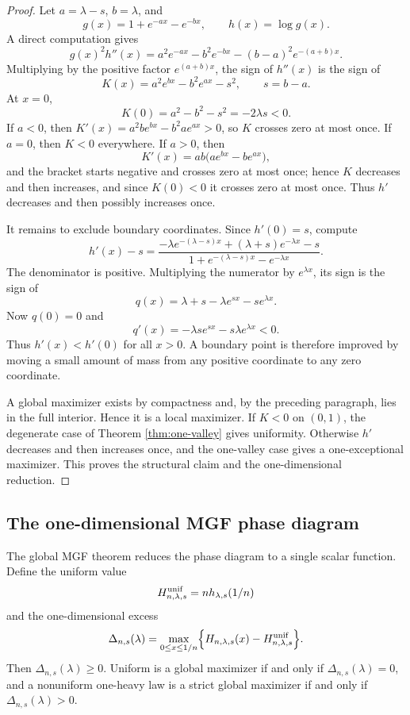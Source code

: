 \documentclass[11pt]{article}
\theoremstyle{definition}
\begin{document}
\begin{proof}
Let $a=\lambda-s$, $b=\lambda$, and
\[
  g(x)=1+e^{-ax}-e^{-bx},
  \qquad h(x)=\log g(x).
\]
A direct computation gives
\[
  g(x)^2h''(x)=a^2e^{-ax}-b^2e^{-bx}-(b-a)^2e^{-(a+b)x}.
\]
Multiplying by the positive factor $e^{(a+b)x}$, the sign of $h''(x)$ is the sign of
\[
  K(x)=a^2e^{bx}-b^2e^{ax}-s^2,
  \qquad s=b-a.
\]
At $x=0$,
\[
  K(0)=a^2-b^2-s^2=-2\lambda s<0.
\]
If $a<0$, then $K'(x)=a^2b e^{bx}-b^2a e^{ax}>0$, so $K$ crosses zero at most once. If $a=0$, then $K<0$ everywhere. If $a>0$, then
\[
  K'(x)=ab\bigl(ae^{bx}-be^{ax}\bigr),
\]
and the bracket starts negative and crosses zero at most once; hence $K$ decreases and then increases, and since $K(0)<0$ it crosses zero at most once. Thus $h'$ decreases and then possibly increases once.

It remains to exclude boundary coordinates. Since $h'(0)=s$, compute
\[
  h'(x)-s
  =\frac{-\lambda e^{-(\lambda-s)x}+(\lambda+s)e^{-\lambda x}-s}
  {1+e^{-(\lambda-s)x}-e^{-\lambda x}}.
\]
The denominator is positive. Multiplying the numerator by $e^{\lambda x}$, its sign is the sign of
\[
  q(x)=\lambda+s-\lambda e^{sx}-s e^{\lambda x}.
\]
Now $q(0)=0$ and
\[
  q'(x)=-\lambda s e^{sx}-s\lambda e^{\lambda x}<0.
\]
Thus $h'(x)<h'(0)$ for all $x>0$.  A boundary point is therefore improved by moving a small amount of mass from any positive coordinate to any zero coordinate.

A global maximizer exists by compactness and, by the preceding paragraph, lies in the full interior.  Hence it is a local maximizer.  If $K<0$ on $(0,1)$, the degenerate case of Theorem \ref{thm:one-valley} gives uniformity.  Otherwise $h'$ decreases and then increases once, and the one-valley case gives a one-exceptional maximizer.  This proves the structural claim and the one-dimensional reduction.
\end{proof}

\subsection{The one-dimensional MGF phase diagram}

The global MGF theorem reduces the phase diagram to a single scalar function.  Define the uniform value
\[
  H^{\rm unif}_{n,\lambda,s}=n h_{\lambda,s}(1/n)
\]
and the one-dimensional excess
\[
  \Delta_{n,s}(\lambda)
  =\max_{0\le x\le1/n}\Bigl\{H_{n,\lambda,s}(x)-H^{\rm unif}_{n,\lambda,s}\Bigr\}.
\]
Then $\Delta_{n,s}(\lambda)\ge0$.  Uniform is a global maximizer if and only if $\Delta_{n,s}(\lambda)=0$, and a nonuniform one-heavy law is a strict global maximizer if and only if $\Delta_{n,s}(\lambda)>0$.
\end{document}

